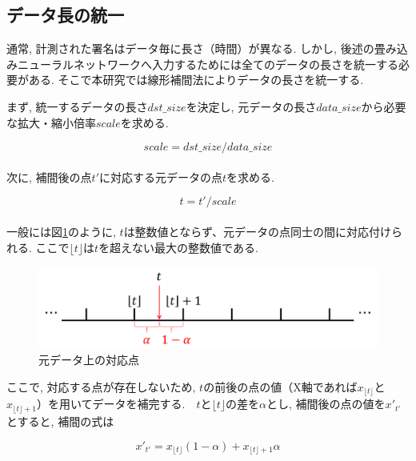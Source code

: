 \subsection{データ長の統一}

通常, 計測された署名はデータ毎に長さ（時間）が異なる. しかし, 後述の畳み込みニューラルネットワークへ入力するためには全てのデータの長さを統一する必要がある. そこで本研究では線形補間法によりデータの長さを統一する. 
 
まず, 統一するデータの長さ$dst\_size$を決定し, 元データの長さ$data\_size$から必要な拡大・縮小倍率$scale$を求める.

\begin{equation}
scale = dst\_size / data\_size \label{eq:eq2}
\end{equation}\\

\noindent
次に, 補間後の点$t'$に対応する元データの点$t$を求める.

\begin{equation}
t = t' / scale \label{eq:eq3}
\end{equation}\\

\noindent
一般には図\ref{fig:PreProcessing4}のように, $t$は整数値とならず、元データの点同士の間に対応付けられる. ここで$\lfloor t \rfloor$は$t$を超えない最大の整数値である.

\begin{figure}[htbp]
  \begin{center}
    \includegraphics[clip,width=16.0cm]{./images/PreProcessing4.png}
    \caption{元データ上の対応点}
    \label{fig:PreProcessing4}
  \end{center}
\end{figure}

\noindent
ここで, 対応する点が存在しないため, $t$の前後の点の値（X軸であれば$x_{\lfloor t \rfloor}$と$x_{\lfloor t \rfloor + 1}$）を用いてデータを補完する.　$t$と$\lfloor t \rfloor$の差を$\alpha$とし, 補間後の点の値を$x'_{t'}$とすると, 補間の式は

\begin{equation}
x'_{t'} = x_{\lfloor t \rfloor}(1 - \alpha) + x_{\lfloor t \rfloor + 1}\alpha　\label{eq:eq4}
\end{equation}\\

